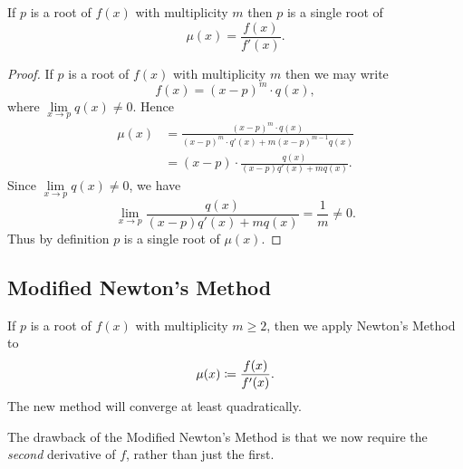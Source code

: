 \documentclass[class=article, crop=false]{standalone}
\begin{document}
  \begin{theorem}{}
    If $p$ is a root of $f(x)$ with multiplicity $m$ then $p$ is a single root of
    \[
      \mu(x) = \frac{f(x)}{f'(x)}.
    \]
    \begin{proof}
      If $p$ is a root of $f(x)$ with multiplicity $m$ then we may write
      \[
        f(x) = (x - p)^m\cdot q(x),
      \]
      where $\lim\limits_{x\to p} q(x)\neq 0$. Hence
      \begin{align*}
        \mu(x) &= \frac{(x - p)^m\cdot q(x)}{(x - p)^m\cdot q'(x) + m(x - p)^{m - 1}q(x)} \\
               &= (x - p)\cdot \frac{q(x)}{(x - p)q'(x) + mq(x)}.
      \end{align*}
      Since $\lim\limits_{x\to p} q(x)\neq 0$, we have
      \[
        \lim_{x\to p} \frac{q(x)}{(x - p)q'(x) + mq(x)} = \frac{1}{m} \neq 0.
      \]
      Thus by definition $p$ is a single root of $\mu(x)$.
    \end{proof}
  \end{theorem}
  \subsection{Modified Newton's Method}
  If $p$ is a root of $f(x)$ with multiplicity $m \geq 2$, then we apply Newton's Method to
  \[
    \mu(x)\coloneqq \frac{f(x)}{f'(x)}.
  \]
  The new method will converge at least quadratically.
  \begin{note}{}
    The drawback of the Modified Newton's Method is that we now require the \emph{second} derivative of $f$, rather than just the first.
  \end{note}
\end{document}
